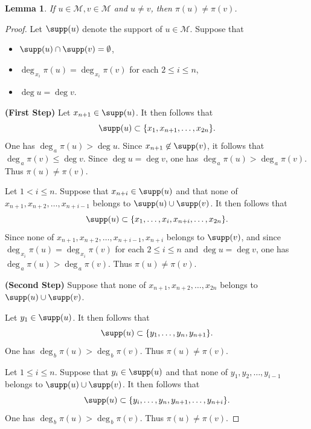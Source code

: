 \documentclass[12pt]{amsart}
\numberwithin{equation}{section}
\newcommand{\cM}{\mathcal{M}}
\newtheorem{Lemma}[Theorem]{Lemma}
\begin{document}
\begin{Lemma}
    If $u \in \cM, v \in \cM$ and $u \neq v$, then $\pi(u) \neq \pi(v)$.
\end{Lemma}

\begin{proof}
Let $\supp(u)$ denote the support of $u \in \cM$.  Suppose that
\begin{itemize}
    \item 
    $\supp(u) \cap \supp(v) = \emptyset$,
    \item 
    $\deg_{\,x_i}{\pi(u)}=\deg_{\,x_i}{\pi(v)}$ for each $2 \leq i \leq n$,
    \item
    $\deg{u}=\deg{v}$.
\end{itemize}

\smallskip

\noindent
{\bf (First Step)} Let $x_{n+1} \in \supp(u)$.  It then follows that
\[
\supp(u) \subset \{x_1, x_{n+1}, \ldots, x_{2n} \}.
\]
One has $\deg_{\,a}{\pi(u)} > \deg{u}$.  Since 
$x_{n+1} \not\in \supp(v)$,
it follows that $\deg_{\,a}{\pi(v)} \leq \deg{v}$.  Since $\deg{u} = \deg{v}$, one has $\deg_{\,a}{\pi(u)} > \deg_{\,a}{\pi(v)}$.  Thus $\pi(u) \neq \pi(v)$.

Let $1 < i \leq n$.  Suppose that $x_{n+i} \in \supp(u)$ and that none of $x_{n+1}, x_{n+2}, \ldots, x_{n+i-1}$ belongs to $\supp(u) \cup \supp(v)$.  It then follows that  
\[
\supp(u) \subset \{x_1, \ldots, x_{i}, x_{n+i}, \ldots, x_{2n} \}.
\]
Since none of $x_{n+1}, x_{n+2}, \ldots, x_{n+i-1}, x_{n+i}$ belongs to $\supp(v)$, and since $\deg_{\,x_i}{\pi(u)}=\deg_{\,x_i}{\pi(v)}$ for each $2 \leq i \leq n$ and $\deg{u} = \deg{v}$, one has $\deg_{\,a}{\pi(u)} > \deg_{\,a}{\pi(v)}$.  Thus $\pi(u) \neq \pi(v)$.

\medskip

\noindent
{\bf (Second Step)}  Suppose that none of $x_{n+1}, x_{n+2}, \ldots, x_{2n}$ belongs to $\supp(u) \cup \supp(v)$.  

Let $y_1 \in \supp(u)$.  It then follows that  
\[
\supp(u) \subset \{y_1, \ldots, y_n, y_{n+1}\}.
\] 
One has $\deg_{\,b}{\pi(u)} > \deg_{\,b}{\pi(v)}$.  Thus $\pi(u) \neq \pi(v)$.

Let $1 \leq i \leq n$.  Suppose that $y_i \in \supp(u)$ and that none of $y_1, y_2, \ldots, y_{i-1}$ belongs to $\supp(u) \cup \supp(v)$.  It then follows that  
\[
\supp(u) \subset \{y_i, \ldots, y_n, y_{n+1}, \ldots, y_{n+i}\}.
\]  
One has $\deg_{\,b}{\pi(u)} > \deg_{\,b}{\pi(v)}$.  Thus $\pi(u) \neq \pi(v)$.


\end{proof}
\end{document}
